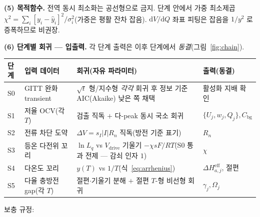 \documentclass[11pt,a4paper]{article}
\newcommand{\dd}{\mathrm{d}}
\newcommand{\eff}{\mathrm{eff}}
\newcommand{\drive}{\mathrm{drive}}
\newcommand{\bg}{\mathrm{bg}}
\begin{document}
\textbf{(5) 목적함수.} 전역 동시 최소화는 공선형으로 금지. 단계 안에서 가중 최소제곱 $\chi^2=\sum_i[y_i-\widehat y_i]^2/\sigma_i^2$(가중은 평활 잔차 잡음). $\dd V/\dd Q$ 좌표 피팅은 잡음을 $1/y^2$ 로 증폭하므로 비권장.

\textbf{(6) 단계별 회귀 — 입출력.} 각 단계 출력은 이후 단계에서 \emph{동결}(그림~\ref{fig:chain}).
\begin{center}
\renewcommand{\arraystretch}{1.35}
\begin{tabular}{p{} p{} p{} p{}}
\toprule
단계 & 입력 데이터 & 회귀(자유 파라미터) & 출력(동결) \\
\midrule
S0 & GITT 완화 transient & $\sqrt t$ 형/지수형 \emph{각각} 회귀 후 정보 기준 AIC(Akaike) 낮은 쪽 채택 & 활성화 지배 확인 \\
S1 & 저율 OCV(각 $T$) & 검출 직독 $+$ 다-peak 동시 국소 회귀 & $\{U_j,w_j,Q_j\},C_\bg$ \\
S2 & 전류 차단 도약 & $\Delta V=s_I|I|R_n$ 직독(방전 기준 표기) & $R_n$ \\
S3 & 등온 다전위 꼬리 & $\ln L_q$ vs $V_\drive$ 기울기 $-\chi sF/RT$(S0 통과 전제 — 감쇠 인자 $1$) & $\chi$ \\
S4 & 다온도 꼬리 & $y(T)$ vs $1/T$(식~\eqref{eq:arrhenius}) & $\Delta H_{a,j}^{\eff}$, 절편 \\
S5 & 다율 충방전 gap(각 $T$) & 절편$\cdot$기울기 분해 $+$ 절편 $T$-형 비선형 회귀 & $\gamma_j,\Omega_j$ \\
\bottomrule
\end{tabular}
\end{center}
보충 규정:
\end{document}
